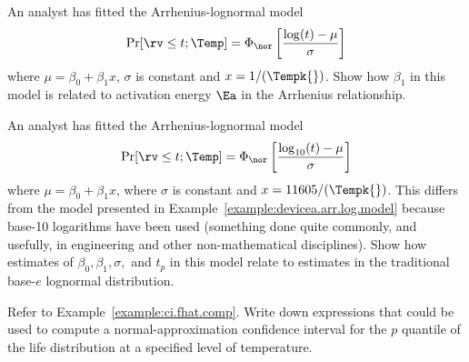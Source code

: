 \begin{exercise}
An analyst has fitted the Arrhenius-lognormal model
\begin{displaymath}
\Pr[\rv\leq t;\Temp] = \Phi_{\nor} 
\left[\frac{\log(t)-\mu}{\sigma} \right]
\end{displaymath}
where $\mu =\beta_{0}+ \beta_{1} x$, $\sigma$ is constant and
$x=1/(\Tempk{})$.  Show how $\beta_{1}$ in this model is related to
activation energy $\Ea$ in the Arrhenius relationship.
\end{exercise}



\begin{exercise}
An analyst has fitted the Arrhenius-lognormal model
\begin{displaymath}
\Pr[\rv \leq t;\Temp] = \Phi_{\nor} 
\left[\frac{\log_{10}(t)-\mu}{\sigma} \right]
\end{displaymath}
where $\mu = \beta_{0}+ \beta_{1} x$, where $\sigma$ is constant and
$x=11605/(\Tempk{})$.  This differs from the model presented in
Example~\ref{example:devicea.arr.log.model} because base-10
logarithms have been used (something done quite commonly, and
usefully, in engineering and other non-mathematical disciplines).
Show how estimates of $\beta_{0}, \beta_{1},
\sigma,$ and $t_{p}$ in this model
relate to estimates in the traditional base-$e$ lognormal
distribution.
\end{exercise}



\begin{exercise}
Refer to Example~\ref{example:ci.fhat.comp}.  Write down expressions
that could be used to compute a normal-approximation confidence
interval for the $p$ quantile of the life distribution at a
specified level of temperature.
\end{exercise}

